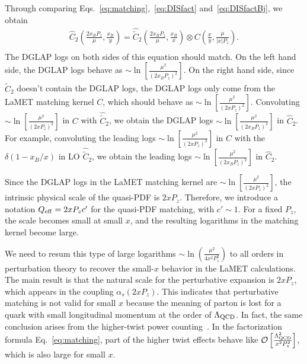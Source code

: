 \documentclass[prd,aps,twocolumn,preprintnumbers, showpacs, nofootinbib,superscriptaddress,notitlepage]{revtex4-2}
\def\bea{\begin{eqnarray}}
\def\eea{\end{eqnarray}}
\begin{document}
Through comparing Eqs.~\eqref{eq:matching},~\eqref{eq:DISfact} and~\eqref{eq:DISfactBj}, we obtain
\bea
\hat{C}_{2}\left(\frac{2 x_B P_z}{\mu}, \frac{x_B}{y} \right)=\hat{\tilde{C}}_{2}\left(\frac{2 x_B P_z}{\mu},\frac{x_B}{x}\right) \otimes C\left(\frac{x}{y},\frac{\mu}{|x|P_{z}}\right).\nonumber\\
\eea
The DGLAP logs on both sides of this equation should match. On the left hand side, the DGLAP logs behave as $\sim \ln \left[\frac{\mu^2}{(2 x_B P_z)^2}\right]$. On the right hand side, since $\hat{\tilde{C}}_{2}$ doesn't contain the DGLAP logs, the DGLAP logs only come from the LaMET matching kernel $C$, which should behave as $\sim \ln \left[\frac{\mu^2}{(2 x P_z)^2}\right]$. Convoluting $\sim \ln \left[\frac{\mu^2}{(2 x P_z)^2}\right]$ in $C$ with $\hat{\tilde{C}}_{2}$, we obtain the DGLAP logs $\sim \ln \left[\frac{\mu^2}{(2 x_B P_z)^2}\right]$ in $\hat{C}_{2}$. For example, convoluting the leading logs $\sim \ln \left[\frac{\mu^2}{(2 x P_z)^2}\right]$ in $C$ with the $\delta(1-x_B/x)$ in LO $\hat{\tilde{C}}_{2}$, we obtain the leading logs $\sim \ln \left[\frac{\mu^2}{(2 x_B P_z)^2}\right]$ in $\hat{C}_{2}$.

Since the DGLAP logs in the LaMET matching kernel are $\sim \ln \left[\frac{\mu^2}{(2 x P_z)^2}\right]$, the intrinsic physical scale of the quasi-PDF is $2 x P_z$. Therefore,
we introduce a notation $Q_{\rm eff}=2xP_zc'$ for the quasi-PDF matching, with $c'\sim 1$. For a fixed $P_z$, the scale becomes small at small $x$, and the resulting logarithms in the matching kernel become large.

We need to resum this type of large logarithms $\sim \ln \left(\frac{\mu^2}{4 x^2 P_z^2} \right)$ to all orders in perturbation theory 
to recover the small-$x$ behavior
in the LaMET calculations. The main result is that the natural scale for the perturbative expansion is $2xP_z$, which appears in the coupling $\alpha_s(2 x P_z)$. This indicates that perturbative matching is not valid for small $x$ because the meaning of parton is lost for a quark with small longitudinal momentum
at the order of $\Lambda_{\rm QCD}$. In fact, the same conclusion arises from the
higher-twist power counting~\cite{Ji:2020ect}.
In the factorization formula Eq.~\eqref{eq:matching}, part of the higher twist effects behave like ${\cal O}\left[\frac{\Lambda_{\rm QCD}^2}{x^2 P_{z}^2}\right]$, which is also large for small $x$. 
\end{document}
